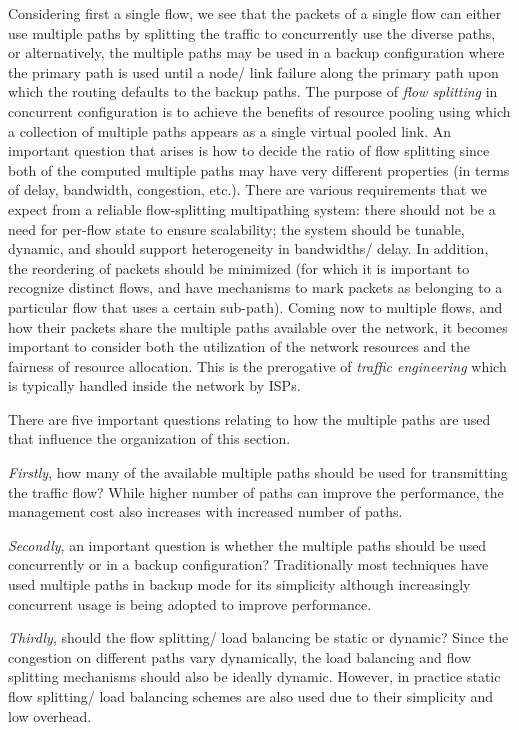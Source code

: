 \documentclass[10pt]{IEEEtran}
\begin{document}
Considering first a single flow, we see that the packets of a single flow can either use multiple paths by splitting the traffic to concurrently use the diverse paths, or alternatively, the multiple paths may be used in a backup configuration where the primary path is used until a node/ link failure along the primary path upon which the routing defaults to the backup paths. The purpose of \emph{flow splitting} in concurrent configuration is to achieve the benefits of resource pooling using which a collection of multiple paths appears as a single virtual pooled link. An important question that arises is how to decide the ratio of flow splitting since both of the computed multiple paths may have very different properties (in terms of delay, bandwidth, congestion, etc.). There are various requirements that we expect from a reliable flow-splitting multipathing system:   there should not be a need for per-flow state to ensure scalability; the system should be tunable, dynamic, and should support heterogeneity in bandwidths/ delay.
In addition, the reordering of packets should be minimized (for which it is important to recognize distinct flows, and have mechanisms to mark packets as belonging to a particular flow that uses a certain sub-path). Coming now to multiple flows, and how their packets share the multiple paths available over the network, it becomes important to consider both the utilization of the network resources and the fairness of resource allocation. This is the prerogative of \emph{traffic engineering} which is typically handled inside the network by ISPs. 

There are five important questions relating to how the multiple paths are used that influence the organization of this section. 

\textit{Firstly}, how many of the available multiple paths should be used for transmitting the traffic flow? While higher number of paths can improve the performance, the management cost also increases with increased number of paths. 

\textit{Secondly}, an important question is whether the multiple paths should be used concurrently or in a backup configuration? Traditionally most techniques have used multiple paths in backup mode for its simplicity although increasingly concurrent usage is being adopted to improve performance. 

\textit{Thirdly}, should the flow splitting/ load balancing be static or dynamic? Since the congestion on different paths vary dynamically, the load balancing and flow splitting mechanisms should also be ideally dynamic. However, in practice static flow splitting/ load balancing schemes are also used due to their simplicity and low overhead. 
\end{document}
